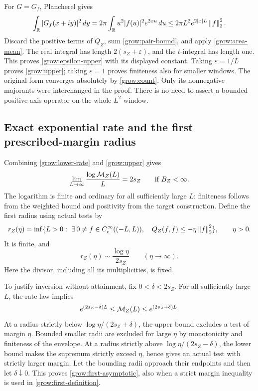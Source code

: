 For \(G=G_f\), Plancherel gives
\[
 \int_\mathbb R|G_f(x+iy)|^2\,dy
   =2\pi\int_\mathbb R u^2|f(u)|^2e^{2xu}\,du
   \le2\pi L^2e^{2|x|L}\left\|f\right\|_2^2.
\]
Discard the positive terms of \(Q_Z\), sum
\eqref{grow:pair-bound}, and apply \eqref{grow:area-mean}.
The real integral has length \(2(s_Z+\varepsilon)\), and the
\(t\)-integral has length one. This proves
\eqref{grow:epsilon-upper} with its displayed constant.
Taking \(\varepsilon=1/L\) proves \eqref{grow:upper}; taking
\(\varepsilon=1\) proves finiteness also for smaller windows.
The original form converges absolutely by \eqref{grow:count}.
Only its nonnegative majorants were interchanged in the proof.
There is no need to assert a bounded positive axis operator on the
whole \(L^2\) window.

\subsection{Exact exponential rate and the first prescribed-margin radius}

Combining \eqref{grow:lower-rate} and \eqref{grow:upper} gives
\begin{equation}\label{grow:exact-rate}
 \lim_{L\to\infty}\frac{\log\mathcal M_Z(L)}L=2s_Z
 \qquad\text{if }B_Z<\infty.
\end{equation}
The logarithm is finite and ordinary for all sufficiently large
\(L\): finiteness follows from the weighted bound and positivity
from the target construction. Define the first radius using actual
tests by
\begin{equation}\label{grow:first-definition}
 r_Z(\eta)=\inf\{L>0:\ \exists\,0\ne f\in
 C_c^\infty((-L,L)),\quad Q_Z(f,f)\le-\eta\left\|f\right\|_2^2\},
 \qquad\eta>0.
\end{equation}
It is finite, and
\begin{equation}\label{grow:first-asymptotic}
 r_Z(\eta)\sim\frac{\log\eta}{2s_Z}
                    \qquad(\eta\to\infty).
\end{equation}
Here the divisor, including all its multiplicities, is fixed.

To justify inversion without attainment, fix \(0<\delta<2s_Z\).
For all sufficiently large \(L\), the rate law implies
\[
 e^{(2s_Z-\delta)L}\le\mathcal M_Z(L)
                        \le e^{(2s_Z+\delta)L}.
\]
At a radius strictly below \(\log\eta/(2s_Z+\delta)\), the
upper bound excludes a test of margin \(\eta\). Bounded smaller
radii are excluded for large \(\eta\) by monotonicity and
finiteness of the envelope. At a radius strictly above
\(\log\eta/(2s_Z-\delta)\), the lower bound makes the supremum
strictly exceed \(\eta\), hence gives an actual test with
strictly larger margin. Let the bounding radii approach their
endpoints and then let \(\delta\downarrow0\). This proves
\eqref{grow:first-asymptotic}, also when a strict margin inequality
is used in \eqref{grow:first-definition}.

